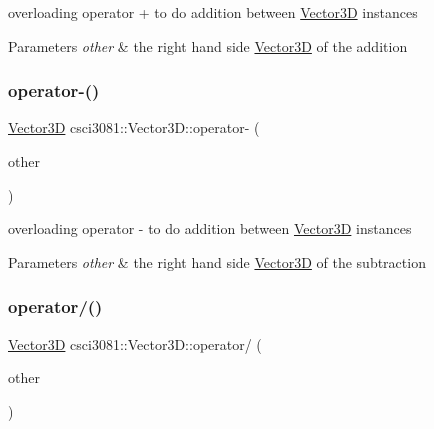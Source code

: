 overloading operator + to do addition between \hyperlink{classcsci3081_1_1Vector3D}{Vector3D} instances 


\begin{DoxyParams}{Parameters}
{\em other} & the right hand side \hyperlink{classcsci3081_1_1Vector3D}{Vector3D} of the addition \\
\hline
\end{DoxyParams}
\mbox{\label{classcsci3081_1_1Vector3D_a9669e80c4ec8cfc7eb2131674d4eaa5f}} 
\subsubsection{\texorpdfstring{operator-\/()}{operator-()}}
{\footnotesize\ttfamily \hyperlink{classcsci3081_1_1Vector3D}{Vector3D} csci3081\+::\+Vector3\+D\+::operator-\/ (\begin{DoxyParamCaption}\item[{const \hyperlink{classcsci3081_1_1Vector3D}{Vector3D} \&}]{other }\end{DoxyParamCaption})}



overloading operator -\/ to do addition between \hyperlink{classcsci3081_1_1Vector3D}{Vector3D} instances 


\begin{DoxyParams}{Parameters}
{\em other} & the right hand side \hyperlink{classcsci3081_1_1Vector3D}{Vector3D} of the subtraction \\
\hline
\end{DoxyParams}
\mbox{\label{classcsci3081_1_1Vector3D_af0f6b2e769921a7a1bdf986f6f3ff277}} 
\subsubsection{\texorpdfstring{operator/()}{operator/()}}
{\footnotesize\ttfamily \hyperlink{classcsci3081_1_1Vector3D}{Vector3D} csci3081\+::\+Vector3\+D\+::operator/ (\begin{DoxyParamCaption}\item[{float}]{other }\end{DoxyParamCaption})}



